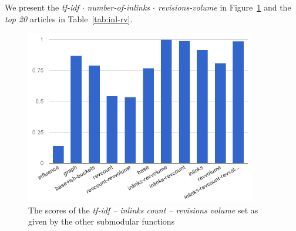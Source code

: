We present the \emph{tf-idf \(\cdot\) number-of-inlinks \(\cdot\)
revisions-volume} in Figure~\ref{img:inl-rv} and the \emph{top 20} articles in
Table~\ref{tab:inl-rv}.
\begin{figure}
  \centering
  \includegraphics[width=0.9\textwidth,natwidth=555,natheight=419]{images/inl-rv.png}
  \caption{The scores of the \emph{tf-idf -- inlinks count -- revisions volume}
  set as given by the other submodular functions}
  \label{img:inl-rv}
\end{figure}

